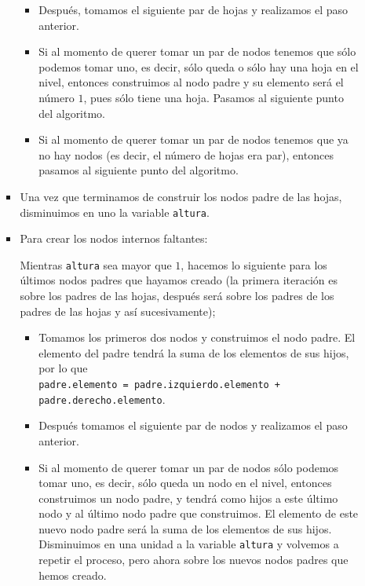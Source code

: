 \documentclass[letterpaper,11pt]{article}
\begin{document}
\begin{enumerate}
\begin{itemize}
\begin{itemize}
\begin{itemize}
                \item Después, tomamos el siguiente par de hojas y realizamos el 
                paso anterior. 
                
                \item Si al momento de querer tomar un par de nodos tenemos que 
                sólo podemos tomar uno, es decir, sólo queda o sólo hay una hoja 
                en el nivel, entonces construimos al nodo padre y su elemento 
                será el número $1$, pues sólo tiene una hoja. Pasamos al
                siguiente punto del algoritmo.

                \item Si al momento de querer tomar un par de nodos tenemos que 
                ya no hay nodos (es decir, el número de hojas era par), entonces 
                pasamos al siguiente punto del algoritmo.
            \end{itemize}

            \item Una vez que terminamos de construir los nodos padre de las
            hojas, disminuimos en uno la variable \texttt{altura}.

            \item Para crear los nodos internos faltantes:

            Mientras \texttt{altura} sea mayor que $1$, hacemos lo siguiente 
            para los últimos nodos padres que hayamos creado (la primera 
            iteración es sobre los padres de las hojas, después será sobre 
            los padres de los padres de las hojas y así sucesivamente); 
            \begin{itemize}
                \item Tomamos los primeros dos nodos y construimos el nodo 
                padre. El elemento del padre tendrá la suma de los elementos 
                de sus hijos, por lo que \\ 
                \texttt{padre.elemento = padre.izquierdo.elemento + 
                padre.derecho.elemento}.
    
                \item Después tomamos el siguiente par de nodos y realizamos 
                el paso anterior. 
                
                \item Si al momento de querer tomar un par de nodos sólo podemos 
                tomar uno, es decir, sólo queda un nodo en el nivel, entonces 
                construimos un nodo padre, y tendrá como hijos a este último nodo 
                y al último nodo padre que construimos. El elemento de este 
                nuevo nodo padre será la suma de los elementos de sus hijos. 
                Disminuimos en una unidad a la variable \texttt{altura} y 
                volvemos a repetir el proceso, pero ahora sobre los nuevos nodos 
                padres que hemos creado.


\end{itemize}
\end{itemize}
\end{itemize}
\end{enumerate}
\end{document}
